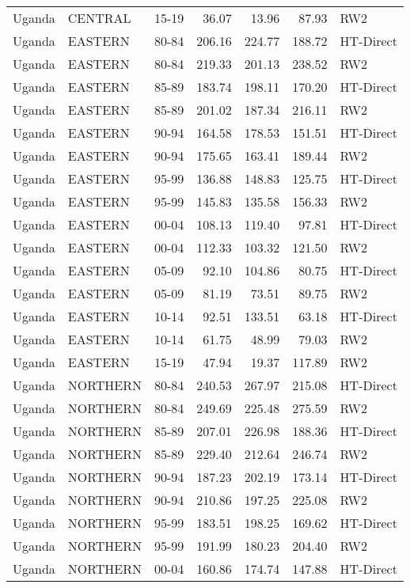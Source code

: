 \begin{longtable}{lllrrrl}
  Uganda & CENTRAL & 15-19 & 36.07 & 13.96 & 87.93 & RW2 \\ 
  Uganda & EASTERN & 80-84 & 206.16 & 224.77 & 188.72 & HT-Direct \\ 
  Uganda & EASTERN & 80-84 & 219.33 & 201.13 & 238.52 & RW2 \\ 
  Uganda & EASTERN & 85-89 & 183.74 & 198.11 & 170.20 & HT-Direct \\ 
  Uganda & EASTERN & 85-89 & 201.02 & 187.34 & 216.11 & RW2 \\ 
  Uganda & EASTERN & 90-94 & 164.58 & 178.53 & 151.51 & HT-Direct \\ 
  Uganda & EASTERN & 90-94 & 175.65 & 163.41 & 189.44 & RW2 \\ 
  Uganda & EASTERN & 95-99 & 136.88 & 148.83 & 125.75 & HT-Direct \\ 
  Uganda & EASTERN & 95-99 & 145.83 & 135.58 & 156.33 & RW2 \\ 
  Uganda & EASTERN & 00-04 & 108.13 & 119.40 & 97.81 & HT-Direct \\ 
  Uganda & EASTERN & 00-04 & 112.33 & 103.32 & 121.50 & RW2 \\ 
  Uganda & EASTERN & 05-09 & 92.10 & 104.86 & 80.75 & HT-Direct \\ 
  Uganda & EASTERN & 05-09 & 81.19 & 73.51 & 89.75 & RW2 \\ 
  Uganda & EASTERN & 10-14 & 92.51 & 133.51 & 63.18 & HT-Direct \\ 
  Uganda & EASTERN & 10-14 & 61.75 & 48.99 & 79.03 & RW2 \\ 
  Uganda & EASTERN & 15-19 & 47.94 & 19.37 & 117.89 & RW2 \\ 
  Uganda & NORTHERN & 80-84 & 240.53 & 267.97 & 215.08 & HT-Direct \\ 
  Uganda & NORTHERN & 80-84 & 249.69 & 225.48 & 275.59 & RW2 \\ 
  Uganda & NORTHERN & 85-89 & 207.01 & 226.98 & 188.36 & HT-Direct \\ 
  Uganda & NORTHERN & 85-89 & 229.40 & 212.64 & 246.74 & RW2 \\ 
  Uganda & NORTHERN & 90-94 & 187.23 & 202.19 & 173.14 & HT-Direct \\ 
  Uganda & NORTHERN & 90-94 & 210.86 & 197.25 & 225.08 & RW2 \\ 
  Uganda & NORTHERN & 95-99 & 183.51 & 198.25 & 169.62 & HT-Direct \\ 
  Uganda & NORTHERN & 95-99 & 191.99 & 180.23 & 204.40 & RW2 \\ 
  Uganda & NORTHERN & 00-04 & 160.86 & 174.74 & 147.88 & HT-Direct \\ 

\end{longtable}
